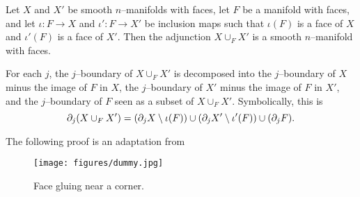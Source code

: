 \begin{prop}
	\label{prop:addface}
	Let $X$ and $X'$ be smooth $n$--manifolds with faces, let $F$ be a manifold with faces, and let $\iota:F\to X$ and $\iota':F\to X'$ be inclusion maps such that $\iota(F)$ is a face of $X$ and $\iota'(F)$ is a face of $X'$.
	Then the adjunction $X\cup_F X'$ is a smooth $n$--manifold with faces.
	
	For each $j$, the $j$--boundary of $X\cup_F X'$ is decomposed into the $j$--boundary of $X$ minus the image of $F$ in $X$, the $j$--boundary of $X'$ minus the image of $F$ in $X'$, and the $j$--boundary of $F$ seen as a subset of $X\cup_F X'$.
	Symbolically, this is $$\partial_j( X \cup_F X') = (\partial_j X\setminus \iota(F))\cup(\partial_j X'\setminus \iota'(F))\cup(\partial_j F).$$
\end{prop}

The following proof is an adaptation from \cite{davis}

\begin{figure}[H]
	\centering
	\caption{Face gluing near a corner.}
	\texttt{[image: figures/dummy.jpg]}
	\label{fig:addface}
\end{figure}

